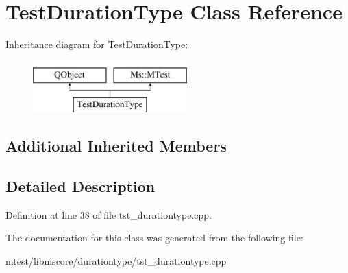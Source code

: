 \hypertarget{class_test_duration_type}{}\section{Test\+Duration\+Type Class Reference}
\label{class_test_duration_type}
Inheritance diagram for Test\+Duration\+Type\+:\begin{figure}[H]
\begin{center}
\leavevmode
\includegraphics[height=2.000000cm]{class_test_duration_type}
\end{center}
\end{figure}
\subsection*{Additional Inherited Members}


\subsection{Detailed Description}


Definition at line 38 of file tst\+\_\+durationtype.\+cpp.



The documentation for this class was generated from the following file\+:\begin{DoxyCompactItemize}
\item 
mtest/libmscore/durationtype/tst\+\_\+durationtype.\+cpp\end{DoxyCompactItemize}
